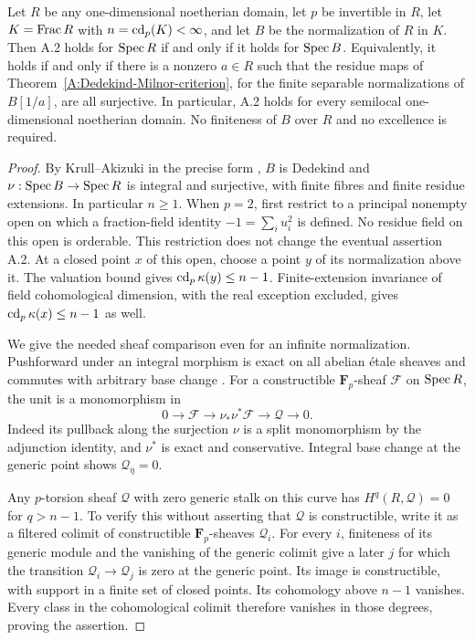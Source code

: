 \begin{theorem}
\label{A:curve-normalization}
Let $R$ be any one-dimensional noetherian domain, let $p$ be
invertible in $R$, let $K=\operatorname{Frac} R$ with $n=\operatorname{cd}_p(K)<\infty$,
and let $B$ be the normalization of $R$ in $K$. Then A.2 holds
for $\operatorname{Spec} R$ if and only if it holds for $\operatorname{Spec} B$.
Equivalently, it holds if and only if there is a nonzero $a\in R$
such that the residue maps of
Theorem~\ref{A:Dedekind-Milnor-criterion}, for the finite separable
normalizations of $B[1/a]$, are all surjective. In particular,
A.2 holds for every semilocal one-dimensional noetherian domain.
No finiteness of $B$ over $R$ and no excellence is required.
\end{theorem}
\begin{proof}
By Krull--Akizuki in the precise form
\citet[Tag 09IG, Lemma 10.120.18]{A_Stacks}, $B$ is Dedekind and
$\nu:\operatorname{Spec} B\to\operatorname{Spec} R$ is integral and surjective, with finite
fibres and finite residue extensions. In particular $n\geq1$.
When $p=2$, first restrict to a principal nonempty open on which
a fraction-field identity $-1=\sum_i u_i^2$ is defined.
No residue field on this open is orderable. This restriction
does not change the eventual assertion A.2. At a closed point
$x$ of this open, choose a point $y$ of its normalization above
it. The valuation bound gives $\operatorname{cd}_p\kappa(y)\leq n-1$.
Finite-extension invariance of field cohomological dimension,
with the real exception excluded, gives
$\operatorname{cd}_p\kappa(x)\leq n-1$ as well.

We give the needed sheaf comparison even for an infinite
normalization. Pushforward under an integral morphism is exact
on all abelian \'etale sheaves
\citep[Tag 04C2, Lemma 59.43.5]{A_Stacks} and commutes with
arbitrary base change
\citep[Tag 0EYP, Lemma 59.55.4]{A_Stacks}. For a constructible
$\mathbf F_p$-sheaf $\mathcal F$ on $\operatorname{Spec} R$, the unit is a
monomorphism in
\[
 0\longrightarrow\mathcal F\longrightarrow\nu_*\nu^*\mathcal F
 \longrightarrow\mathcal Q\longrightarrow0.
\]
Indeed its pullback along the surjection $\nu$ is a split
monomorphism by the adjunction identity, and $\nu^*$ is exact and
conservative. Integral base change at the generic point shows
$\mathcal Q_{\overline\eta}=0$.

Any $p$-torsion sheaf $\mathcal Q$ with zero generic stalk on this
curve has $H^q(R,\mathcal Q)=0$ for $q>n-1$. To verify this
without asserting that $\mathcal Q$ is constructible, write it
as a filtered colimit of constructible $\mathbf F_p$-sheaves
$\mathcal Q_i$. For every $i$, finiteness of its generic module
and the vanishing of the generic colimit give a later $j$ for
which the transition $\mathcal Q_i\to\mathcal Q_j$ is zero
at the generic point. Its image is constructible, with support
in a finite set of closed points. Its cohomology above $n-1$
vanishes. Every class in the cohomological colimit therefore
vanishes in those degrees, proving the assertion.


\end{proof}
